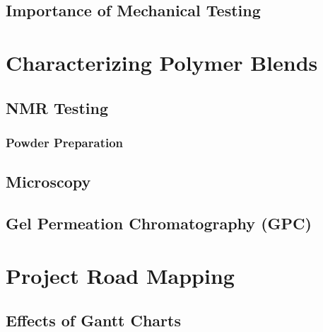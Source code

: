 \subsection{Importance of Mechanical Testing\label{sec:literatureReview:testing:importance}}

\section{Characterizing Polymer Blends\label{sec:literatureReview:characterization}}

\subsection{NMR Testing\label{sec:literatureReview:characterization:NMR}}

\subsubsection{Powder Preparation\label{sec:literatureReview:characterization:NMR:powderPrep}}

\subsection{Microscopy\label{sec:literatureReview:characterization:microscopy}}

\subsection{Gel Permeation Chromatography (GPC)\label{sec:literatureReview:characterization:GPC}}

\section{Project Road Mapping\label{sec:literatureReview:roadmap}}

\subsection{Effects of Gantt Charts\label{sec:literatureReview:roadmap:gantt}}

